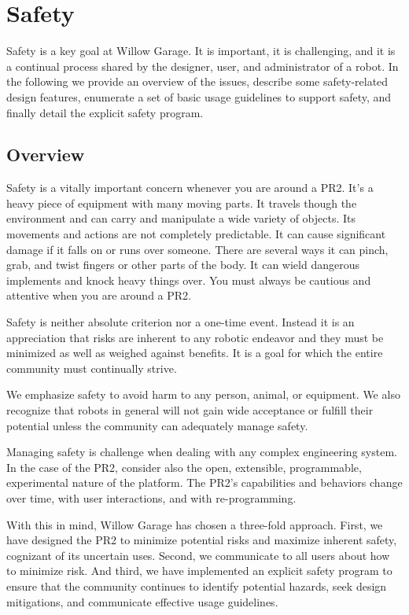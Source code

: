 
\chapter{Safety}

Safety is a key goal at Willow Garage.  It is important, it is challenging, and it is a continual process shared by the designer, user, and administrator of a robot.  In the following we provide an overview of the issues, describe some safety-related design features, enumerate a set of basic usage guidelines to support safety, and finally detail the explicit safety program.

\section{Overview}

Safety is a vitally important concern whenever you are around a PR2. It’s a heavy piece of equipment with many moving parts. It travels though the environment and can carry and manipulate a wide variety of objects. Its movements and actions are not completely predictable. It can cause significant damage if it falls on or runs over someone. There are several ways it can pinch, grab, and twist fingers or other parts of the body. It can wield dangerous implements and knock heavy things over. You must always be cautious and attentive when you are around a PR2.

Safety is neither absolute criterion nor a one-time event.  Instead it is an appreciation that risks are inherent to any robotic endeavor and they must be minimized as well as weighed against benefits.  It is a goal for which the entire community must continually strive.

We emphasize safety to avoid harm to any person, animal, or equipment.  We also recognize that robots in general will not gain wide acceptance or fulfill their potential unless the community can adequately manage safety.

Managing safety is challenge when dealing with any complex engineering system.  In the case of the PR2, consider also the open, extensible, programmable, experimental nature of the platform.  The PR2's capabilities and behaviors change over time, with user interactions, and with re-programming.

With this in mind, Willow Garage has chosen a three-fold approach.  First, we have designed the PR2 to minimize potential risks and maximize inherent safety, cognizant of its uncertain uses.  Second, we communicate to all users about how to minimize risk. And third, we have implemented an explicit safety program to ensure that the community continues to identify potential hazards, seek design mitigations, and communicate effective usage guidelines.

